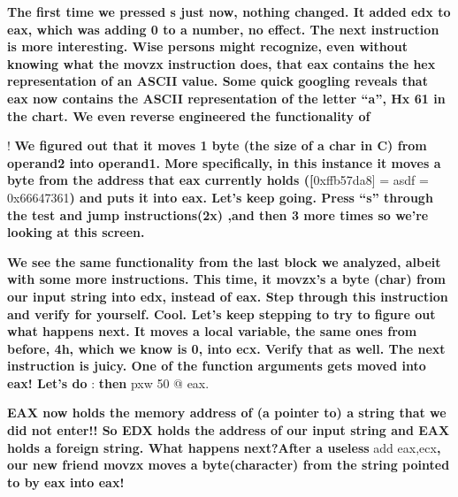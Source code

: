 \documentclass[letterpaper]{article}
\newcommand{\sitfig}[3]{
\begin{figure}[H]
\centering
\makebox[\textwidth][c]{
#2
}
\label{#1}
\end{figure}
}
\newcommand{\sitgfx}[4][scale=1.0]{
\sitfig{#3}{\texttt{[image: \#2]}}{#4}
}
\begin{document}
  
\sitgfx[width=6.5in,height=2.5138in]{FINALWORKINGDOCFORMERLYPRECURSOR-img036.png}{fig:unk}{TODO CAPTION}
\textbf{The first time we pressed s just now, nothing changed. It added edx to eax, which was adding 0 to a number, no
effect. The next instruction is more interesting. Wise persons might recognize, even without knowing what the movzx
instruction does, that eax contains the hex representation of an ASCII value. Some quick googling reveals that eax now
contains the ASCII representation of the letter ``a'', Hx 61 in the chart. We even reverse engineered the functionality
of }  
\sitgfx[width=6.3543in,height=0.2291in]{FINALWORKINGDOCFORMERLYPRECURSOR-img037.png}{fig:unk}{TODO CAPTION}
 !\newline
\textbf{We figured out that it moves 1 byte (the size of a char in C) from operand2 into operand1.  More specifically,
in this instance it moves a byte from the address that eax currently holds ([}0xffb57da8] = asdf = 0x66647361\textbf{)
and puts it into eax. Let's keep going. Press ``s'' through the test and jump instructions(2x) ,and then 3 more times
so we're looking at this screen.}  
\sitgfx[width=6.5in,height=1.8335in]{FINALWORKINGDOCFORMERLYPRECURSOR-img038.png}{fig:unk}{TODO CAPTION}
 

\begin{center}
 
  \sitgfx[width=1.6043in,height=4.9272in]{FINALWORKINGDOCFORMERLYPRECURSOR-img039.png}{fig:unk}{TODO CAPTION}

\end{center}
\textbf{We see the same functionality from the last block we analyzed, albeit with some more instructions. This time, it
movzx's a byte (char) from our input string into edx, instead of eax. Step through this instruction and verify for
yourself.\newline
Cool. Let's keep stepping to try to figure out what happens next. It moves a local variable, the same ones from before,
4h, which we know is 0, into ecx. Verify that as well. The next instruction is juicy. One of the function arguments
gets moved into eax! Let's do} : \textbf{then }pxw 50 @ eax.   
\sitgfx[width=6.5in,height=4.5138in]{FINALWORKINGDOCFORMERLYPRECURSOR-img040.png}{fig:unk}{TODO CAPTION}
 

\begin{center}
 
  \sitgfx[width=1.8543in,height=0.2189in]{FINALWORKINGDOCFORMERLYPRECURSOR-img041.png}{fig:unk}{TODO CAPTION}

\end{center}
\textbf{EAX now holds the memory address of (a pointer to) a string that we did not enter!! So EDX holds the address of
our input string and EAX holds a foreign string. What happens next?After a useless }add eax,ecx\textbf{, our new friend
movzx moves a byte(character) from the string pointed to by eax into eax! }  
\sitgfx[width=6.5in,height=2.0555in]{FINALWORKINGDOCFORMERLYPRECURSOR-img042.png}{fig:unk}{TODO CAPTION}
 
\end{document}
